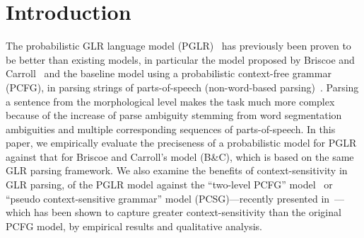 


\maketitle

\section{Introduction}
The probabilistic GLR language model (PGLR)~\cite{Inui:97a} has
previously been proven to be better than existing models, in
particular the model proposed by Briscoe and Carroll~\cite{Briscoe:93}
and the baseline model using a probabilistic context-free grammar
(PCFG), in parsing strings of parts-of-speech (non-word-based
parsing)~\cite{Virach:97c}. Parsing a sentence from the morphological
level makes the task much more complex because of the increase of
parse ambiguity stemming from word segmentation ambiguities and
multiple corresponding sequences of parts-of-speech. In this paper, we
empirically evaluate the preciseness of a probabilistic model for PGLR
against that for Briscoe and Carroll's model (B\&C), which is based on
the same GLR parsing framework. We also examine the benefits of
context-sensitivity in GLR parsing, of the PGLR model against the
``two-level PCFG'' model~\cite{Chitrao:90} or ``pseudo
context-sensitive grammar'' model (PCSG)---recently presented
in~\cite{Charniak:94}---which has been shown to capture greater
context-sensitivity than the original PCFG model, by empirical results
and qualitative analysis.

